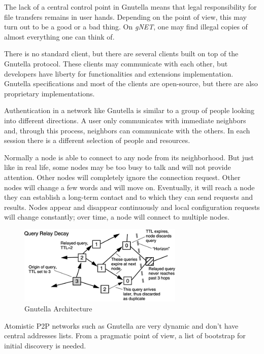 The lack of a central control point in Gnutella means that legal
responsibility for file transfers remains in user hands. Depending on the
point of view, this may turn out to be a good or a bad thing. On
\textit{gNET}, one may find illegal copies of almost everything one can think
of.

There is no standard client, but there are several clients built on top of the
Gnutella protocol. These clients may communicate with each other, but
developers have liberty for functionalities and extensions implementation.
Gnutella specifications and most of the clients are open-source, but there are
also proprietary implementations.

Authentication in a network like Gnutella is similar to a group of people
looking into different directions. A user only communicates with immediate
neighbors and, through this process, neighbors can communicate with the others.
In each session there is a different selection of people and resources.

Normally a node is able to connect to any node from its neighborhood. But just
like in real life, some nodes may be too busy to talk and will not provide
attention. Other nodes will completely ignore the connection request. Other
nodes will change a few words and will move on. Eventually, it will reach a
node they can establish a long-term contact and to which they can send
requests and results. Nodes appear and disappear continuously and local
configuration requests will change constantly; over time, a node will connect
to multiple nodes.

\begin{figure}
  \centering
  \includegraphics[width=0.7\textwidth]{src/img/p2p-systems/gnutella}
  \caption{Gnutella Architecture}
  \label{fig:p2p-systems:gnutella}
\end{figure}

Atomistic P2P networks such as Gnutella are very dynamic and don't have central
addresses lists. From a pragmatic point of view, a list of bootstrap for initial
discovery is needed.


